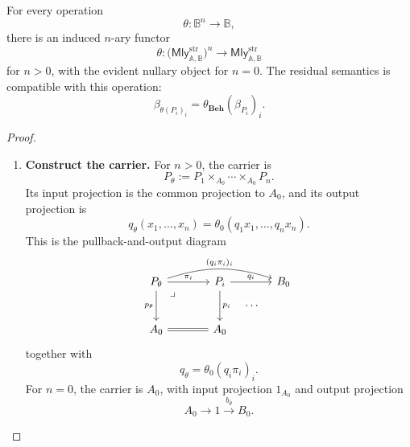 \begin{lemma}
\label{lem:structured-operations-semantic}
    For every operation
    \[
        \theta:\mathbb B^n\to\mathbb B,
    \]
    there is an induced \(n\)-ary functor
    \[
        \theta:
        \bigl(\mathsf{Mly}^{\mathrm{str}}_{\mathbb A,\mathbb B}\bigr)^n
        \to
        \mathsf{Mly}^{\mathrm{str}}_{\mathbb A,\mathbb B}
    \]
    for \(n>0\), with the evident nullary object for \(n=0\). The residual
    semantics is compatible with this operation:
    \[
        \beta_{\theta(P_i)_i}
        =
        \theta_{\mathbf{Beh}}(\beta_{P_i})_i.
    \]
\end{lemma}

\begin{proof}
    \leavevmode
    \begin{enumerate}
        \item \textbf{Construct the carrier.}
        For \(n>0\), the carrier is
        \[
            P_\theta:=P_1\times_{A_0}\cdots\times_{A_0}P_n.
        \]
        Its input projection is the common projection to \(A_0\), and its
        output projection is
        \[
            q_\theta(x_1,\dots,x_n)
            =
            \theta_0(q_1x_1,\dots,q_nx_n).
        \]
        This is the pullback-and-output diagram
        \[
        \begin{tikzcd}[column sep=large, row sep=large]
            P_\theta
                \arrow[r, "\pi_i"]
                \arrow[d, "p_\theta"']
                \arrow[dr, phantom, "\lrcorner", very near start]
                \arrow[rr, bend left=18, "{(q_i\pi_i)_i}"]
            &
            P_i
                \arrow[d, "p_i"]
                \arrow[r, "q_i"]
            &
            B_0
            \\
            A_0
                \arrow[r, equal]
            &
            A_0
                \arrow[ur, phantom, "\cdots" description]
            &
        \end{tikzcd}
        \]
        together with
        \[
            q_\theta=\theta_0(q_i\pi_i)_i.
        \]
        For \(n=0\), the carrier is \(A_0\), with input projection
        \(1_{A_0}\) and output projection
        \[
            A_0\to 1\xrightarrow{b_\theta}B_0.
        \]


\end{enumerate}
\end{proof}
